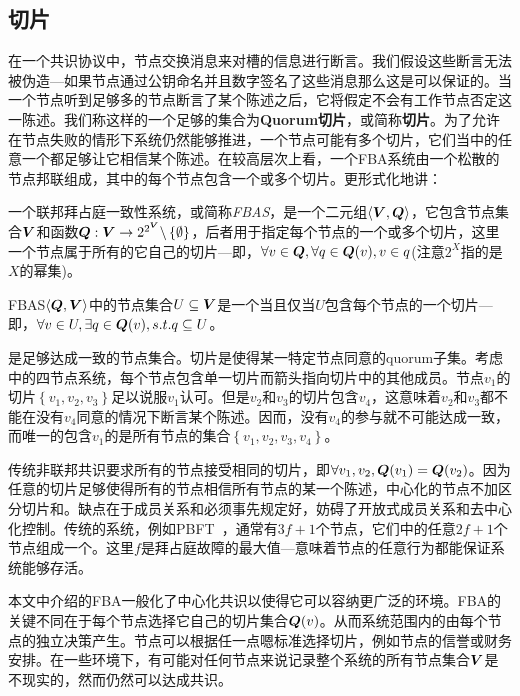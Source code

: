 \subsection{{\quorum}切片}

在一个共识协议中，节点交换消息来对槽的信息进行断言。我们假设这些断言无法被伪造---如果节点通过公钥命名并且数字签名了这些消息那么这是可以保证的。当一个节点听到足够多的节点断言了某个陈述之后，它将假定不会有工作节点否定这一陈述。我们称这样的一个足够的集合为\textbf{Quorum切片}，或简称\textbf{切片}。为了允许在节点失败的情形下系统仍然能够推进，一个节点可能有多个切片，它们当中的任意一个都足够让它相信某个陈述。在较高层次上看，一个FBA系统由一个松散的节点邦联组成，其中的每个节点包含一个或多个切片。更形式化地讲：

\begin{definition}[FBAS]
	一个联邦拜占庭一致性系统，或简称\textit{FBAS}，是一个二元组$\langle{\bm V}, {\bm Q}\rangle$，它包含节点集合${\bm V}$和{\quorum}函数${\bm Q}:{\bm V}\rightarrow2^{2^{{\bm V}}}\backslash\left\{\emptyset\right\}$，后者用于指定每个节点的一个或多个切片，这里一个节点属于所有的它自己的切片---即，$\forall v\in{\bm Q},\forall q\in{{\bm Q}(v)},v\in q$(注意$2^X$指的是$X$的幂集)。
\end{definition}

\begin{definition}[\quorum]
	FBAS$\langle{\bm Q},{\bm V}\rangle$中的节点集合$U\subseteq{\bm V}$是一个\textit{\quorum}当且仅当$U$包含每个节点的一个切片---即，$\forall v\in U, \exists q \in {\bm Q}(v), s.t. q\subseteq U$。
\end{definition}

{\quorum}是足够达成一致的节点集合。切片是使得某一特定节点同意的quorum子集。考虑中的四节点系统，每个节点包含单一切片而箭头指向切片中的其他成员。节点$v_1$的切片$\left\{v_1,v_2,v_3\right\}$足以说服$v_1$认可。但是$v_2$和$v_3$的切片包含$v_4$，这意味着$v_2$和$v_3$都不能在没有$v_4$同意的情况下断言某个陈述。因而，没有$v_4$的参与就不可能达成一致，而唯一的包含$v_1$的{\quorum}是所有节点的集合$\left\{v_1,v_2,v_3,v_4\right\}$。

传统非联邦共识要求所有的节点接受相同的切片，即$\forall v_1, v_2, {\bm Q}(v_1)={\bm Q}(v_2)$。因为任意的切片足够使得所有的节点相信所有节点的某一个陈述，中心化的节点不加区分切片和{\quorum}。缺点在于成员关系和{\quorum}必须事先规定好，妨碍了开放式成员关系和去中心化控制。传统的系统，例如PBFT~\cite{Castro:1999:PBFT}，通常有$3f+1$个节点，它们中的任意$2f+1$个节点组成一个{\quorum}。这里$f$是拜占庭故障的最大值---意味着节点的任意行为都能保证系统能够存活。

本文中介绍的FBA一般化了中心化共识以使得它可以容纳更广泛的环境。FBA的关键不同在于每个节点选择它自己的{\quorum}切片集合${\bm Q}(v)$。从而系统范围内的{\quorum}由每个节点的独立决策产生。节点可以根据任一点嗯标准选择切片，例如节点的信誉或财务安排。在一些环境下，有可能对任何节点来说记录整个系统的所有节点集合${{\bm V}}$是不现实的，然而仍然可以达成共识。